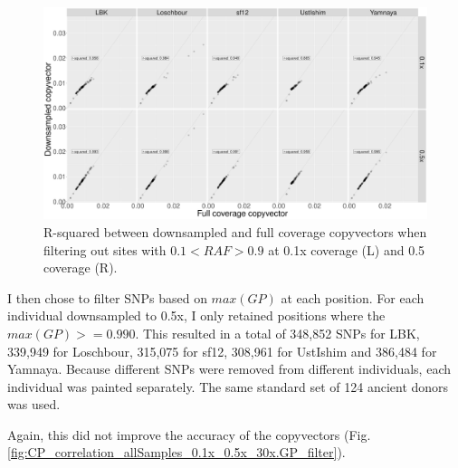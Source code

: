 \begin{figure}[htp]
    \centering
    \includegraphics[width=1.0\textwidth]{../images/chapter1/CP_correlation_allSamples_0.1x_0.5x_30x.RAF_filter.png}
    \caption{R-squared between downsampled and full coverage copyvectors when filtering out sites with $0.1 < RAF > 0.9$ at 0.1x coverage (L) and 0.5 coverage (R).}
    \label{fig:CP_correlation_allSamples_0.1x_0.5x_30x.RAF_filter}
\end{figure}
 
I then chose to filter SNPs based on $max(GP)$ at each position. For each individual downsampled to 0.5x, I only retained positions where the $max(GP) >= 0.990$. This resulted in a total of 348,852 SNPs for LBK, 339,949 for Loschbour, 315,075 for sf12, 308,961 for UstIshim and 386,484 for Yamnaya. Because different SNPs were removed from different individuals, each individual was painted separately. The same standard set of 124 ancient donors was used. 

Again, this did not improve the accuracy of the copyvectors (Fig. \ref{fig:CP_correlation_allSamples_0.1x_0.5x_30x.GP_filter}).

